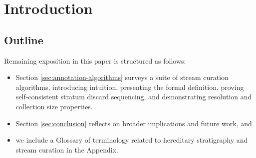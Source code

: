 \section{Introduction} \label{sec:introduction}


% 


\subsection{Outline}

Remaining exposition in this paper is structured as follows:
\begin{itemize}
\item Section \ref{sec:annotation-algorithms} surveys a suite of stream curation algorithms, introducing intuition, presenting the formal definition, proving self-consistent stratum discard sequencing, and demonstrating resolution and collection size properties.
\item Section \ref{sec:conclusion} reflects on broader implications and future work, and
\item we include a Glossary of terminology related to hereditary stratigraphy and stream curation in the Appendix.
\end{itemize}
